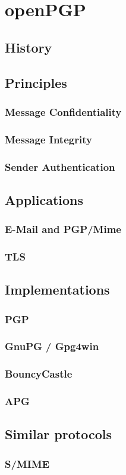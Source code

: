 \chapter{openPGP}

\section{History}

\section{Principles}

\subsection{Message Confidentiality}

\subsection{Message Integrity}

\subsection{Sender Authentication}

\section{Applications}

\subsection{E-Mail and PGP/Mime}

\subsection{TLS}

\section{Implementations}

\subsection{PGP}

\subsection{GnuPG / Gpg4win}

\subsection{BouncyCastle}

\subsection{APG}

\section{Similar protocols}

\subsection{S/MIME}